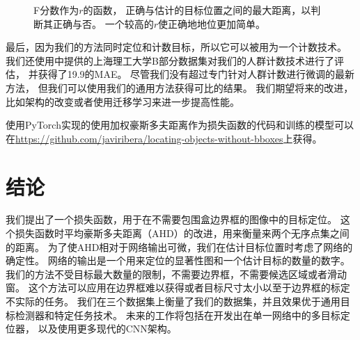 \documentclass[10pt,twocolumn,letterpaper,UTF8]{article}
\begin{document}
    \begin{figure}[htbp]
      \caption{
               F分数作为$r$的函数，
               正确与估计的目标位置之间的最大距离，以判断其正确与否。
               一个较高的$r$使正确地地位更加简单。}
      \label{fig:precnrec}
    \end{figure}

最后，因为我们的方法同时定位和计数目标，所以它可以被用为一个计数技术。
我们还使用\cite{zhang2016}中提供的上海理工大学B部分数据集对我们的人群计数技术进行了评估，
并获得了19.9的MAE。
尽管我们没有超过专门针对人群计数进行微调的最新方法\cite{li2018}，
但我们可以使用我们的通用方法获得可比的结果。
我们期望将来的改进，比如架构的改变或者使用迁移学习来进一步提高性能。


使用PyTorch实现的使用加权豪斯多夫距离作为损失函数的代码和训练的模型可以在\url{https://github.com/javiribera/locating-objects-without-bboxes}上获得。






\section{结论}
我们提出了一个损失函数，用于在不需要包围盒边界框的图像中的目标定位。
这个损失函数时平均豪斯多夫距离（AHD）的改进，用来衡量来两个无序点集之间的距离。
为了使AHD相对于网络输出可微，我们在估计目标位置时考虑了网络的确定性。
网络的输出是一个用来定位的显著性图和一个估计目标的数量的数字。
我们的方法不受目标最大数量的限制，不需要边界框，不需要候选区域或者滑动窗。
这个方法可以应用在边界框难以获得或者目标尺寸太小以至于边界框的标定不实际的任务。
我们在三个数据集上衡量了我们的数据集，并且效果优于通用目标检测器和特定任务技术。
未来的工作将包括在开发出在单一网络中的多目标定位器，
以及使用更多现代的CNN架构。
\end{document}
